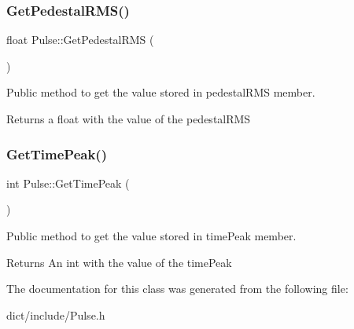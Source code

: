 \subsubsection{\texorpdfstring{Get\+Pedestal\+R\+M\+S()}{GetPedestalRMS()}}
{\footnotesize\ttfamily float Pulse\+::\+Get\+Pedestal\+R\+MS (\begin{DoxyParamCaption}{ }\end{DoxyParamCaption})}



Public method to get the value stored in pedestal\+R\+MS member. 

\begin{DoxyReturn}{Returns}
a float with the value of the pedestal\+R\+MS 
\end{DoxyReturn}
\mbox{\label{classPulse_aab7891a017015171250c3e290ac4a3eb}} 
\subsubsection{\texorpdfstring{Get\+Time\+Peak()}{GetTimePeak()}}
{\footnotesize\ttfamily int Pulse\+::\+Get\+Time\+Peak (\begin{DoxyParamCaption}{ }\end{DoxyParamCaption})}



Public method to get the value stored in time\+Peak member. 

\begin{DoxyReturn}{Returns}
An int with the value of the time\+Peak 
\end{DoxyReturn}


The documentation for this class was generated from the following file\+:\begin{DoxyCompactItemize}
\item 
dict/include/Pulse.\+h\end{DoxyCompactItemize}
